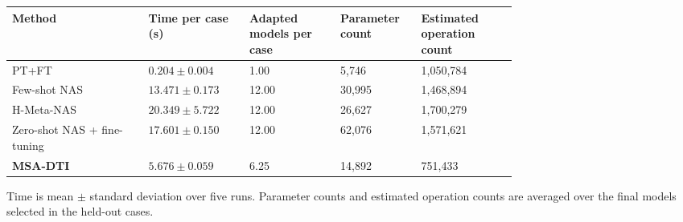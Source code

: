 \begin{center}
\begin{minipage}{\linewidth}
\label{tab:target-cost}
\centering
\scriptsize
\renewcommand{\arraystretch}{1.07}
\setlength{\tabcolsep}{2.8pt}
\begin{tabularx}{\linewidth}
{Y Z{0.20\linewidth} Z{0.18\linewidth} Z{0.16\linewidth} Z{0.19\linewidth}}
\toprule
Method
& Time per case (s)
& Adapted models per case
& Parameter count
& Estimated operation count \\
\midrule
PT+FT
& $0.204\pm0.004$
& 1.00
& 5{,}746
& 1{,}050{,}784 \\
Few-shot NAS
& $13.471\pm0.173$
& 12.00
& 30{,}995
& 1{,}468{,}894 \\
H-Meta-NAS
& $20.349\pm5.722$
& 12.00
& 26{,}627
& 1{,}700{,}279 \\
Zero-shot NAS + fine-tuning
& $17.601\pm0.150$
& 12.00
& 62{,}076
& 1{,}571{,}621 \\
\textbf{MSA-DTI}
& $5.676\pm0.059$
& 6.25
& 14{,}892
& 751{,}433 \\
\bottomrule
\end{tabularx}
\vspace{2pt}
\par\footnotesize
Time is mean $\pm$ standard deviation over five runs. Parameter
counts and estimated operation counts are averaged over the final models
selected in the held-out cases.
\end{minipage}
\end{center}
